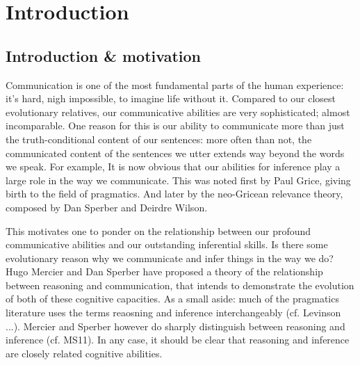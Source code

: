 \chapter*{Introduction}
\label{ch:introduction}


\section{Introduction \& motivation}

Communication is one of the most fundamental parts of the human experience: it's hard, nigh impossible, to imagine life without it. Compared to our closest evolutionary relatives, our communicative abilities are very sophisticated; almost incomparable. One reason for this is our ability to communicate more than just the truth-conditional content of our sentences: more often than not, the communicated content of the sentences we utter extends way beyond the words we speak. For example,
It is now obvious that our abilities for inference play a large role in the way we communicate. This was noted first by Paul Grice, giving birth to the field of pragmatics. And later by the neo-Gricean relevance theory, composed by Dan Sperber and Deirdre Wilson.

This motivates one to ponder on the relationship between our profound communicative abilities and our outstanding inferential skills. Is there some evolutionary reason why we communicate and infer things in the way we do?
Hugo Mercier and Dan Sperber have proposed a theory of the relationship between reasoning and communication, that intends to demonstrate the evolution of both of these cognitive capacities.
As a small aside: much of the pragmatics literature uses the terms reaosning and inference interchangeably (cf. Levinson ...). Mercier and Sperber however do sharply distinguish between reasoning and inference (cf. MS11). In any case, it should be clear that reasoning and inference are closely related cognitive abilities.

